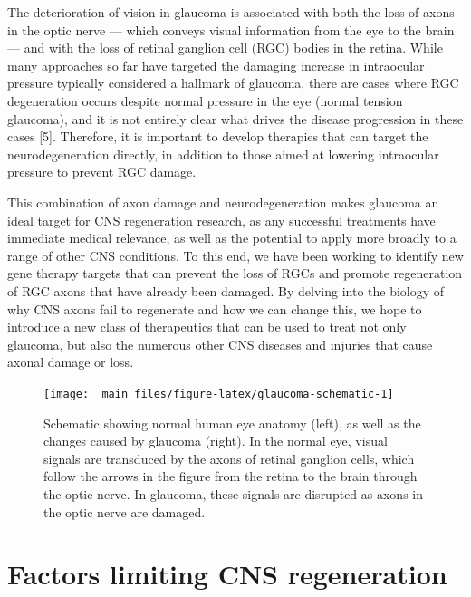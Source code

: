 \documentclass[
  12pt,
  a4paper,
]{book}
\begin{document}
The deterioration of vision in glaucoma is associated with both the loss of axons in the optic nerve --- which conveys visual information from the eye to the brain --- and with the loss of retinal ganglion cell (RGC) bodies in the retina. While many approaches so far have targeted the damaging increase in intraocular pressure typically considered a hallmark of glaucoma, there are cases where RGC degeneration occurs despite normal pressure in the eye (normal tension glaucoma), and it is not entirely clear what drives the disease progression in these cases {[}5{]}. Therefore, it is important to develop therapies that can target the neurodegeneration directly, in addition to those aimed at lowering intraocular pressure to prevent RGC damage.

This combination of axon damage and neurodegeneration makes glaucoma an ideal target for CNS regeneration research, as any successful treatments have immediate medical relevance, as well as the potential to apply more broadly to a range of other CNS conditions. To this end, we have been working to identify new gene therapy targets that can prevent the loss of RGCs and promote regeneration of RGC axons that have already been damaged. By delving into the biology of why CNS axons fail to regenerate and how we can change this, we hope to introduce a new class of therapeutics that can be used to treat not only glaucoma, but also the numerous other CNS diseases and injuries that cause axonal damage or loss.

\begin{figure}
\texttt{[image: \_main\_files/figure-latex/glaucoma-schematic-1]} \caption[Glaucoma schematic]{Schematic showing normal human eye anatomy (left), as well as the changes caused by glaucoma (right).  In the normal eye, visual signals are transduced by the axons of retinal ganglion cells, which follow the arrows in the figure from the retina to the brain through the optic nerve.  In glaucoma, these signals are disrupted as axons in the optic nerve are damaged.}\label{fig:glaucoma-schematic}
\end{figure}

\hypertarget{factors-limiting-cns-regeneration}{%
\section{Factors limiting CNS regeneration}\label{factors-limiting-cns-regeneration}}
\end{document}
